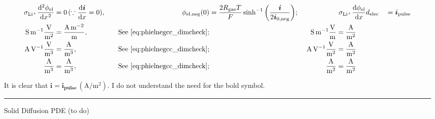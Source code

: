 \documentclass{article}
\begin{document}
\begin{alignat}{4}
    \sigma_\mathrm{Li^+}\diff[2]{\phi_\text{el}}{x} &= 0\, (\because \diff{\bm{i}}{x}=0),  &\qquad \phi_\text{el,neg}(0) &= \frac{2 R_\text{gas} T}{F} \sinh^{-1}\bigg(\frac{\bm{i}}{2 \bm{i_\text{0,neg}}}\bigg); &&\  \sigma_\mathrm{Li^+}\diff{\phi_\text{el}}{x}{d_\text{elec}} &&= \bm{i_\text{pulse}} \\
    \si{\siemens\per\metre}\frac{\si{\volt}}{\si{\meter\squared}} &= \frac{\si{\ampere\per\meter\squared}}{\si{\meter}}, &\quad \text{See}~\eqref{eq:phielnegcc_dimcheck}; &&\ \si{\siemens\per\meter}\frac{\si{\volt}}{\si{\meter}} &= \frac{\si{\ampere}}{\si{\meter\squared}} \\
    \si{\ampere\per\volt}\frac{\si{\volt}}{\si{\meter\cubed}} &= \frac{\si{\ampere}}{\si{\meter\cubed}}, &\quad \text{See}~\eqref{eq:phielnegcc_dimcheck}; &&\ \si{\ampere\per\volt}\frac{\si{\volt}}{\si{\meter\squared}} &= \frac{\si{\ampere}}{\si{\meter\squared}} \\
    \frac{\si{\ampere}}{\si{\meter\cubed}} &= \frac{\si{\ampere}}{\si{\meter\cubed}}, &\quad \text{See}~\eqref{eq:phielnegcc_dimcheck}; &&\ \frac{\si{\ampere}}{\si{\meter\squared}} &= \frac{\si{\ampere}}{\si{\meter\squared}} \\
\end{alignat}

It is clear that \(\bm{i} = \bm{i_\text{pulse}}\, (\si{\ampere\per\meter\squared})\). I do not understand the need for the bold symbol.

\medskip
\hrule

\bigskip

Solid Diffusion PDE (to do)
\end{document}
